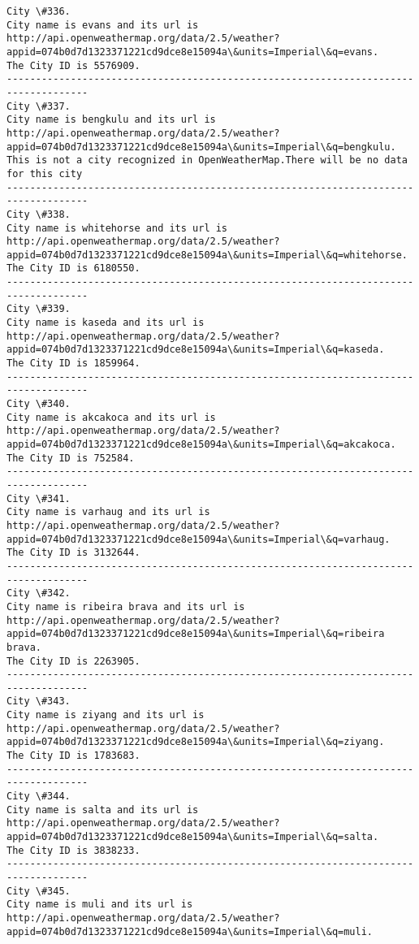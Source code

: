 \documentclass[11pt]{article}
\begin{document}
\begin{Verbatim}[commandchars=\\\{\}]
City \#336.
City name is evans and its url is http://api.openweathermap.org/data/2.5/weather?appid=074b0d7d1323371221cd9dce8e15094a\&units=Imperial\&q=evans.
The City ID is 5576909.
------------------------------------------------------------------------------------
City \#337.
City name is bengkulu and its url is http://api.openweathermap.org/data/2.5/weather?appid=074b0d7d1323371221cd9dce8e15094a\&units=Imperial\&q=bengkulu.
This is not a city recognized in OpenWeatherMap.There will be no data for this city
------------------------------------------------------------------------------------
City \#338.
City name is whitehorse and its url is http://api.openweathermap.org/data/2.5/weather?appid=074b0d7d1323371221cd9dce8e15094a\&units=Imperial\&q=whitehorse.
The City ID is 6180550.
------------------------------------------------------------------------------------
City \#339.
City name is kaseda and its url is http://api.openweathermap.org/data/2.5/weather?appid=074b0d7d1323371221cd9dce8e15094a\&units=Imperial\&q=kaseda.
The City ID is 1859964.
------------------------------------------------------------------------------------
City \#340.
City name is akcakoca and its url is http://api.openweathermap.org/data/2.5/weather?appid=074b0d7d1323371221cd9dce8e15094a\&units=Imperial\&q=akcakoca.
The City ID is 752584.
------------------------------------------------------------------------------------
City \#341.
City name is varhaug and its url is http://api.openweathermap.org/data/2.5/weather?appid=074b0d7d1323371221cd9dce8e15094a\&units=Imperial\&q=varhaug.
The City ID is 3132644.
------------------------------------------------------------------------------------
City \#342.
City name is ribeira brava and its url is http://api.openweathermap.org/data/2.5/weather?appid=074b0d7d1323371221cd9dce8e15094a\&units=Imperial\&q=ribeira brava.
The City ID is 2263905.
------------------------------------------------------------------------------------
City \#343.
City name is ziyang and its url is http://api.openweathermap.org/data/2.5/weather?appid=074b0d7d1323371221cd9dce8e15094a\&units=Imperial\&q=ziyang.
The City ID is 1783683.
------------------------------------------------------------------------------------
City \#344.
City name is salta and its url is http://api.openweathermap.org/data/2.5/weather?appid=074b0d7d1323371221cd9dce8e15094a\&units=Imperial\&q=salta.
The City ID is 3838233.
------------------------------------------------------------------------------------
City \#345.
City name is muli and its url is http://api.openweathermap.org/data/2.5/weather?appid=074b0d7d1323371221cd9dce8e15094a\&units=Imperial\&q=muli.

\end{Verbatim}
\end{document}
